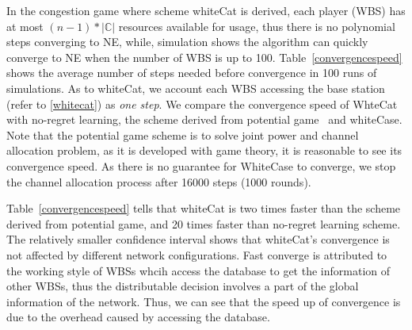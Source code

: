 \documentclass[times]{ettauth}
\theoremstyle{mytheoremstyle}
\theoremstyle{mytheoremstyle}
\theoremstyle{mytheoremstyle}
\begin{document}
In the congestion game where scheme whiteCat is derived, each player (WBS) has at most $(n-1)*|\mathbb{C}|$ resources available for usage, thus there is no polynomial steps converging to NE, while, simulation shows the algorithm can quickly converge to NE when the number of WBS is up to 100. 
%
Table~\ref{convergencespeed} shows the average number of steps needed before convergence in 100 runs of simulations.
As to whiteCat, we account each WBS accessing the base station (refer to \ref{whitecat}) as \textit{one step}.
We compare the convergence speed of WhteCat with no-regret learning, the scheme derived from potential game~\cite{pimrc_2012} and whiteCase.
Note that the potential game scheme is to solve joint power and channel allocation problem, as it is developed with game theory, it is reasonable to see its convergence speed.
As there is no guarantee for WhiteCase to converge, we stop the channel allocation process after 16000 steps (1000 rounds).

Table~\ref{convergencespeed} tells that whiteCat is two times faster than the scheme derived from potential game, and 20 times faster than no-regret learning scheme.
The relatively smaller confidence interval shows that whiteCat's convergence is not affected by different network configurations.
Fast converge is attributed to the working style of WBSs whcih access the database to get the information of other WBSs, thus the distributable decision involves a part of the global information of the network.
Thus, we can see that the speed up of convergence is due to the overhead caused by accessing the database.
\end{document}

